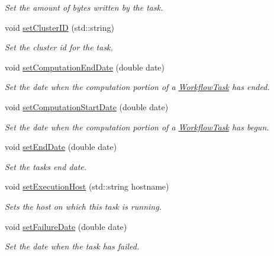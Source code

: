 \begin{DoxyCompactItemize}
\begin{DoxyCompactList}\small\item\em Set the amount of bytes written by the task. \end{DoxyCompactList}\item 
void \hyperlink{classwrench_1_1_workflow_task_ab8d621c9cf50b489fd6b092bea59872a}{set\+Cluster\+ID} (std\+::string)
\begin{DoxyCompactList}\small\item\em Set the cluster id for the task. \end{DoxyCompactList}\item 
void \hyperlink{classwrench_1_1_workflow_task_a573befd39e3efcc2a8979e81c4b106b9}{set\+Computation\+End\+Date} (double date)
\begin{DoxyCompactList}\small\item\em Set the date when the computation portion of a \hyperlink{classwrench_1_1_workflow_task}{Workflow\+Task} has ended. \end{DoxyCompactList}\item 
void \hyperlink{classwrench_1_1_workflow_task_ad9f7174070a9a90da70c683b507f94e7}{set\+Computation\+Start\+Date} (double date)
\begin{DoxyCompactList}\small\item\em Set the date when the computation portion of a \hyperlink{classwrench_1_1_workflow_task}{Workflow\+Task} has begun. \end{DoxyCompactList}\item 
void \hyperlink{classwrench_1_1_workflow_task_ae21597fdb24597909735883bda7544cf}{set\+End\+Date} (double date)
\begin{DoxyCompactList}\small\item\em Set the task\textquotesingle{}s end date. \end{DoxyCompactList}\item 
void \hyperlink{classwrench_1_1_workflow_task_aaabcde52939be67fbc645f937a7a1bc2}{set\+Execution\+Host} (std\+::string hostname)
\begin{DoxyCompactList}\small\item\em Sets the host on which this task is running. \end{DoxyCompactList}\item 
void \hyperlink{classwrench_1_1_workflow_task_a03f9ebebaa0ec710e6b094f04eb221f5}{set\+Failure\+Date} (double date)
\begin{DoxyCompactList}\small\item\em Set the date when the task has failed. \end{DoxyCompactList}\item 

\end{DoxyCompactItemize}
